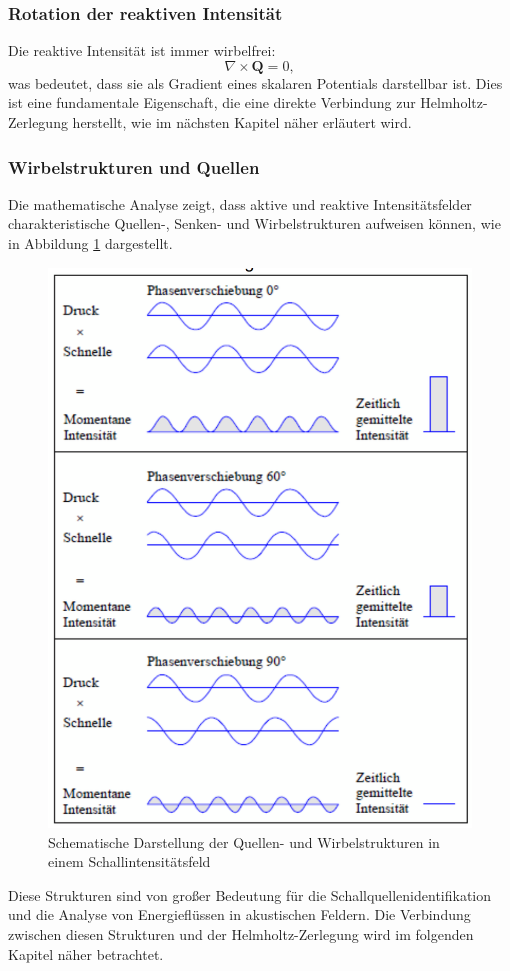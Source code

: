 \subsubsection{Rotation der reaktiven Intensität}

Die reaktive Intensität ist immer wirbelfrei:
\begin{equation}
\nabla \times \boldsymbol{Q} = 0,
\end{equation}
was bedeutet, dass sie als Gradient eines skalaren Potentials darstellbar ist.
Dies ist eine fundamentale Eigenschaft, die eine direkte Verbindung zur Helmholtz-Zerlegung herstellt, wie im nächsten Kapitel näher erläutert wird.

\subsubsection{Wirbelstrukturen und Quellen}

Die mathematische Analyse zeigt, dass aktive und reaktive Intensitätsfelder charakteristische Quellen-, Senken- und Wirbelstrukturen aufweisen können, wie in Abbildung \ref{fig:Schallintensitaet} dargestellt.

\begin{figure}
\centering
\includegraphics[scale=0.4]{papers/helmholtz/images/Schallintensitaet.png}
\caption{Schematische Darstellung der Quellen- und Wirbelstrukturen in einem Schallintensitätsfeld}
\label{fig:Schallintensitaet}
\end{figure}

Diese Strukturen sind von großer Bedeutung für die Schallquellenidentifikation und die Analyse von Energieflüssen in akustischen Feldern.
Die Verbindung zwischen diesen Strukturen und der Helmholtz-Zerlegung wird im folgenden Kapitel näher betrachtet.





